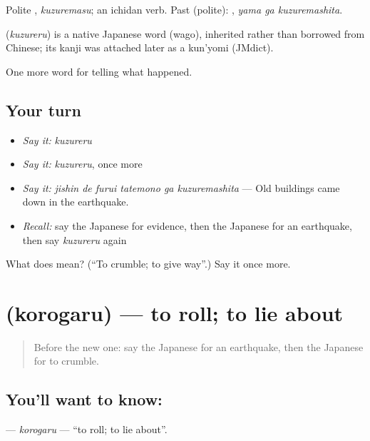 Polite \textbf{}, \emph{kuzuremasu}; an ichidan verb. Past (polite): \textbf{ }, \emph{yama ga kuzuremashita}.

\begin{cousinweb}
\textbf{} (\emph{kuzureru}) is a native Japanese word (wago), inherited rather than borrowed from Chinese; its kanji was attached later as a kun'yomi (JMdict).
\end{cousinweb}

\begin{grammarlens}[title={What you've built}]
One more word for telling what happened.
\end{grammarlens}

\subsection*{Your turn}
\begin{itemize}
\raggedright
  \item \emph{Say it:} \emph{kuzureru}
  \item \emph{Say it:} \emph{kuzureru}, once more
  \item \emph{Say it:} \emph{jishin de furui tatemono ga kuzuremashita} — Old buildings came down in the earthquake.
  \item \emph{Recall:} say the Japanese for evidence, then the Japanese for an earthquake, then say \emph{kuzureru} again
\end{itemize}

\begin{tcolorbox}[breakable,colback=teal!4,colframe=teal!35!black,title={Before you move on}]
What does  mean? (\textquotedblleft{}To crumble; to give way\textquotedblright{}.) Say it once more.
\end{tcolorbox}
\section[\texorpdfstring{\ja{ころがる} (korogaru)}{ころがる (korogaru)}]{ (korogaru) — to roll; to lie about}

\label{lesson:JA-C274-korogaru}



\begin{quote}
Before the new one: say the Japanese for an earthquake, then the Japanese for to crumble.
\end{quote}

\subsection*{You'll want to know: }
\textbf{} — \emph{korogaru} — \textquotedblleft{}to roll; to lie about\textquotedblright{}.


